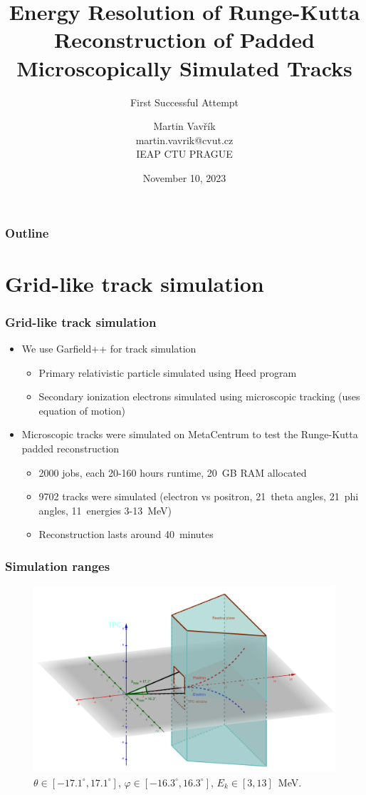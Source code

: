 \documentclass{beamer}
\title[Runge-Kutta Algorithm Energy Resolution]{Energy Resolution of Runge-Kutta Reconstruction of Padded Microscopically Simulated Tracks}
\subtitle{First Successful Attempt}
\author[M.~Vavřík]{\foreignlanguage{czech}{Martin Vavřík}\vspace{0.5cm}\\martin.vavrik@cvut.cz\\IEAP CTU PRAGUE\\}
\date{November 10, 2023}
\begin{document}
	
	\begin{frame}
		\titlepage
	\end{frame}
	
	\begin{frame}
		\frametitle{Outline}
		\tableofcontents
	\end{frame}
	
	\section{Grid-like track simulation}
		\begin{frame}
			\frametitle{Grid-like track simulation}
			\begin{itemize}
				\item We use Garfield++ for track simulation
				\begin{itemize}
					\item Primary relativistic particle simulated using Heed program~\cite{heed}
					\item Secondary ionization electrons simulated using microscopic tracking (uses equation of motion)
				\end{itemize}
				\item Microscopic tracks were simulated on MetaCentrum to test the Runge-Kutta padded reconstruction
				\begin{itemize}
					\item 2000 jobs, each 20-160 hours runtime, 20~GB RAM allocated
					\item 9702 tracks were simulated (electron vs positron, 21~theta angles, 21~phi angles, 11~energies 3-13~MeV)
					\item Reconstruction lasts around 40~minutes
				\end{itemize}
			\end{itemize}
		\end{frame}
		
		\begin{frame}
		\frametitle{Simulation ranges}
			\begin{figure}
				\centering
				\includegraphics[width = 0.9 \linewidth]{images/tpc_micro_simulation.png}
				\caption{$\theta \in [-17.1^\circ,17.1^\circ]$, $\varphi \in [-16.3^\circ,16.3^\circ]$, $ E_k \in [3,13] $~MeV.}
			\end{figure}
		\end{frame}
	
\end{document}
